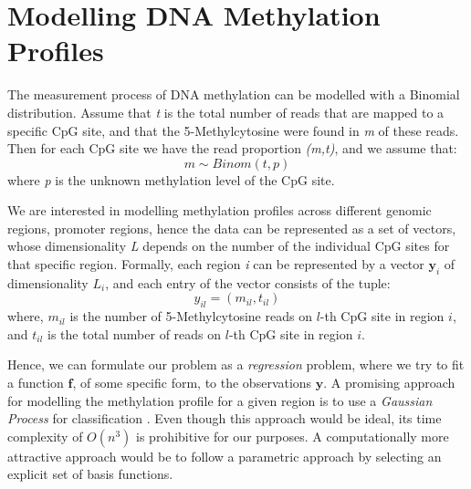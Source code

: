 \section{Modelling DNA Methylation Profiles} \label{model-meth-profiles-s}
The measurement process of DNA methylation can be modelled with a Binomial distribution. Assume that \emph{t} is the total number of reads that are mapped to a specific CpG site, and that the 5-Methylcytosine were found in \emph{m} of these reads. Then for each CpG site we have the read proportion \emph{(m,t)}, and we assume that:
\begin{equation} \label{binom-1d-f-meth}
	m \sim Binom(t, p)
\end{equation}
where \emph{p} is the unknown methylation level of the CpG site.

We are interested in modelling methylation profiles across different genomic regions, \eg promoter regions, hence the data can be represented as a set of vectors, whose dimensionality \emph{L} depends on the number of the individual CpG sites for that specific region. Formally, each region \emph{i} can be represented by a vector $\mathbf{y}_{i}$ of dimensionality $L_{i}$, and each entry of the vector consists of the tuple:
\begin{equation}
	y_{il} = (m_{il},t_{il})
\end{equation}
where, $m_{il}$ is the number of 5-Methylcytosine reads on $l$-th CpG site in region $i$, and $t_{il}$ is the total number of reads on $l$-th CpG site in region $i$. 

Hence, we can formulate our problem as a \emph{regression} problem, where we try to fit a function $\mathbf{f}$, of some specific form, to the observations $\mathbf{y}$. A promising approach for modelling the methylation profile for a given region is to use a \emph{Gaussian Process} for classification \citep{Rasmussen2006}. Even though this approach would be ideal, its time complexity of $O(n^{3})$ is prohibitive for our purposes. A computationally more attractive approach would be to follow a parametric approach by selecting an explicit set of basis functions.

